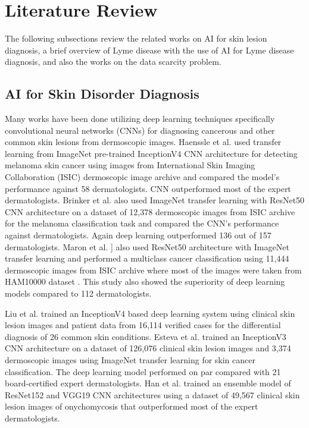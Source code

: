 \section{Literature Review}\label{sec:litreview}
The following subsections review the related works on AI for skin lesion diagnosis, a brief overview of Lyme disease with the use of AI for Lyme disease diagnosis, and also the works on the data scarcity problem.
\subsection{AI for Skin Disorder Diagnosis}
Many works have been done utilizing deep learning techniques specifically convolutional neural networks (CNNs) for diagnosing cancerous and other common skin lesions from dermoscopic images. Haenssle et al. \cite{Haenssle2018} used transfer learning from ImageNet \cite{Russakovsky2015} pre-trained InceptionV4 CNN architecture for detecting melanoma skin cancer using images from International Skin Imaging Collaboration (ISIC) \cite{Codella2019} dermoscopic image archive and compared the model's performance against 58 dermatologists. CNN outperformed most of the expert dermatologists. Brinker et al. \cite{Brinker2019} also used ImageNet transfer learning with ResNet50 CNN architecture on a dataset of 12,378 dermoscopic images from ISIC archive for the melanoma classification task and compared the CNN's performance against dermatologists. Again deep learning outperformed 136 out of 157 dermatologists. Maron et al. \cite{Maron2019}] also used ResNet50 architecture with ImageNet transfer learning and performed a multiclass cancer classification using 11,444 dermoscopic images from ISIC archive where most of the images were taken from HAM10000 dataset \cite{Tschandl2018}. This study also showed the superiority of deep learning models compared to 112 dermatologists. 

Liu et al. \cite{Liu2020} trained an InceptionV4 based deep learning system using clinical skin lesion images and patient data from 16,114 verified cases for the differential diagnosis of 26 common skin conditions. Esteva et al. \cite{Esteva2017} trained an InceptionV3 CNN architecture on a dataset of 126,076 clinical skin lesion images and 3,374 dermoscopic images using ImageNet transfer learning for skin cancer classification. The deep learning model performed on par compared with 21 board-certified expert dermatologists. Han et al. \cite{Han2018} trained an ensemble model of ResNet152 and VGG19 CNN architectures using a dataset of 49,567 clinical skin lesion images of onychomycosis that outperformed most of the expert dermatologists.

